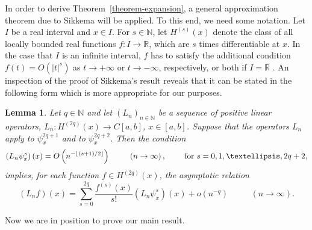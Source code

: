 \documentclass[10pt,a4paper]{amsart}
\newtheorem{lemma}[theorem]{Lemma}
\begin{document}
In order to derive Theorem~\ref{theorem-expansion}, a general approximation
theorem due to Sikkema \cite[Theorem~3]{Sikkema1970a} will be applied. To
this end, we need some notation. Let $I$ be a real interval and $x\in I$.
For $s\in \mathbb{N}$, let $H^{\left( s\right) }\left( x\right) $ denote the
class of all locally bounded real functions $f:I\rightarrow \mathbb{R}$,
which are $s$ times differentiable at $x$. In the case that $I$ is an
infinite interval, $f$ has to satisfy the additional condition $f\left(
t\right) =O\left( \left\vert t\right\vert ^{s}\right) $ as $t\rightarrow
+\infty $ or $t\rightarrow -\infty $, respectively, or both if $I=\mathbb{R}$%
. An inspection of the proof of Sikkema's result reveals that it can be
stated in the following form which is more appropriate for our purposes.

\begin{lemma}
\label{Lemma-Sikkema}Let $q\in \mathbb{N}$ and let $\left( L_{n}\right)
_{n\in \mathbb{N}}$ be a sequence of positive linear operators, $%
L_{n}:H^{\left( 2q\right) }\left( x\right) \rightarrow C\left[ a,b\right] $, 
$x\in \left[ a,b\right] $. Suppose that the operators $L_{n}$ apply to $\psi
_{x}^{2q+1}$ and to $\psi _{x}^{2q+2}$. Then the condition 
\begin{equation*}
\left( L_{n}\psi _{x}^{s}\right) \left( x\right) =O\left( n^{-\left \lfloor
\left( s+1\right) /2\right \rfloor }\right) \text{ \qquad }\left(
n\rightarrow \infty \right) ,\text{ \qquad for }s=0,1,\ldots ,2q+2,
\end{equation*}%
implies, for each function $f\in H^{\left( 2q\right) }\left( x\right) $, the
asymptotic relation 
\begin{equation*}
\left( L_{n}f\right) \left( x\right) =\sum_{s=0}^{2q}\frac{f^{\left(
s\right) }\left( x\right) }{s!}\left( L_{n}\psi _{x}^{s}\right) \left(
x\right) +o\left( n^{-q}\right) \text{ }\qquad \left( n\rightarrow \infty
\right) .
\end{equation*}
\end{lemma}

Now we are in position to prove our main result.
\end{document}

